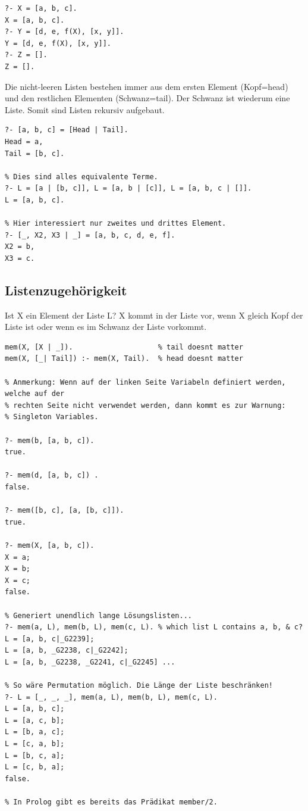\begin{lstlisting}[caption=Listen in Prolog]
?- X = [a, b, c].
X = [a, b, c].
?- Y = [d, e, f(X), [x, y]].
Y = [d, e, f(X), [x, y]].
?- Z = [].
Z = [].
\end{lstlisting}

Die nicht-leeren Listen bestehen immer aus dem ersten Element (Kopf=head) und den restlichen Elementen (Schwanz=tail). Der Schwanz ist wiederum eine Liste. Somit sind Listen rekursiv aufgebaut.

\newpage

\begin{lstlisting}[caption=Tail-Operator auf Listen]
?- [a, b, c] = [Head | Tail].
Head = a,
Tail = [b, c].

% Dies sind alles equivalente Terme.
?- L = [a | [b, c]], L = [a, b | [c]], L = [a, b, c | []].
L = [a, b, c].

% Hier interessiert nur zweites und drittes Element.
?- [_, X2, X3 | _] = [a, b, c, d, e, f].
X2 = b,
X3 = c.
\end{lstlisting}

\subsection{Listenzugehörigkeit}
Ist X ein Element der Liste L? X kommt in der Liste vor, wenn X gleich Kopf der Liste ist oder wenn es im Schwanz der Liste vorkommt. 

\begin{lstlisting}[caption=Listenzugehörigkeit]
mem(X, [X | _]). 					% tail doesnt matter
mem(X, [_| Tail]) :- mem(X, Tail). 	% head doesnt matter

% Anmerkung: Wenn auf der linken Seite Variabeln definiert werden, welche auf der
% rechten Seite nicht verwendet werden, dann kommt es zur Warnung: 
% Singleton Variables.

?- mem(b, [a, b, c]).
true.

?- mem(d, [a, b, c]) .
false.

?- mem([b, c], [a, [b, c]]).
true.

?- mem(X, [a, b, c]).
X = a;
X = b;
X = c;
false.

% Generiert unendlich lange Lösungslisten...
?- mem(a, L), mem(b, L), mem(c, L). % which list L contains a, b, & c?
L = [a, b, c|_G2239];
L = [a, b, _G2238, c|_G2242];
L = [a, b, _G2238, _G2241, c|_G2245] ...

% So wäre Permutation möglich. Die Länge der Liste beschränken!
?- L = [_, _, _], mem(a, L), mem(b, L), mem(c, L).
L = [a, b, c];
L = [a, c, b];
L = [b, a, c];
L = [c, a, b];
L = [b, c, a];
L = [c, b, a];
false.

% In Prolog gibt es bereits das Prädikat member/2.
\end{lstlisting}

